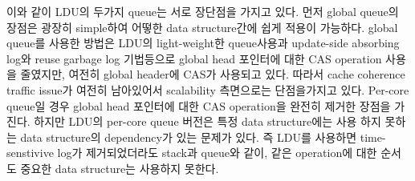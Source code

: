 \fi

\ifkor
이와 같이 LDU의 두가지 queue는 서로 장단점을 가지고 있다. 
먼저 global queue의 장점은 광장히 simple하여 어떻한 data structure간에 쉽게 적용이 가능하다.
global queue를 사용한 방법은 LDU의 light-weight한 queue사용과 update-side absorbing log와
reuse garbage log 기법등으로 global head 포인터에 대한 CAS operation 사용을 줄였지만, 여전히 global
header에 CAS가 사용되고 있다. 
따라서 cache coherence traffic issue가 여전히 남아있어서 scalability 측면으로는 단점을가지고 있다.
Per-core queue일 경우 global head 포인터에 대한 CAS operation을 완전히 제거한 장점을 가진다.
하지만 LDU의 per-core queue 버전은 특정 data structure에는 사용 하지 못하는 data structure의
dependency가 있는 문제가 있다.
즉 LDU를 사용하면 time-senstivive log가 제거되었더라도 stack과 queue와 같이, 같은 operation에 대한 순서도
중요한 data structure는 사용하지 못한다.
\else

















